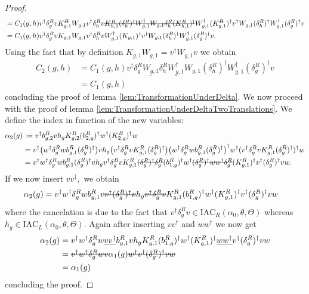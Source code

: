 \documentclass[11pt,a4paper,twoside]{article}
\numberwithin{equation}{section}
\begin{document}
\begin{proof}
\begin{align}
			&=C_1(g,h)v^\dagger \delta_g^R v K_{g,1}^\stkout{R} W_{g,1}v^\dagger \delta_h^R v \stkout{K_{h,1}^R (\delta_h^R)^\dagger W_{g,1}^\dagger W_{g,1}\delta_h^R (K_{h,1}^R)^\dagger} W_{g,1}^\dagger (K_{g,1}^\stkout{R})^\dagger v^\dagger W_{g,1}(\delta^R_h)^\dagger W_{g,1}^\dagger(\delta_g^R)^\dagger v\\
			&=C_1(g,h)v^\dagger \delta_g^R v K_{g,1} W_{g,1}v^\dagger \delta_h^R v W_{g,1}^\dagger (K_{g,1})^\dagger v^\dagger W_{g,1}(\delta^R_h)^\dagger W_{g,1}^\dagger(\delta_g^R)^\dagger v.
		\end{align}
		Using the fact that by definition $K_{g,1}W_{g,1}=v^\dagger W_{g,1}v$ we obtain
		\begin{align}
			C_2(g,h)&=C_1(g,h)v^\dagger \delta_g^R \underline{W_{g,1}} \delta_h^R \underline{W_{g,1}^\dagger} W_{g,1}(\delta^R_h)^\dagger W_{g,1}^\dagger(\delta_g^R)^\dagger v\\
			&=C_1(g,h)
		\end{align}
		concluding the proof of lemma \ref{lem:TransformationUnderDelta}. We now proceed with the proof of lemma \ref{lem:TransformationUnderDeltaTwoTranslations}. We define the index in function of the new variables:
		\begin{align}
			\alpha_2(g)&\defeq v^\dagger b^R_{g,2}v h_g K^R_{g,2}(b^R_{2,g})^\dagger w^\dagger (K^R_{2,g})^\dagger w\\
			&=v^\dagger \left(w^\dagger\delta^R_g w b_{g,1}^R (\delta^R_g)^\dagger\right) v h_g \left(v^\dagger \delta_g^R v K_{g,1}^R (\delta_g^R)^\dagger\right) \left(w^\dagger\delta^R_g w b_{g,1}^R (\delta^R_g)^\dagger\right)^\dagger w^\dagger (v^\dagger \delta_g^R v K_{g,1}^R (\delta_g^R)^\dagger)^\dagger w\\
			&=v^\dagger w^\dagger\delta^R_g w b_{g,1}^R (\delta^R_g)^\dagger v h_g v^\dagger \delta_g^R v K_{g,1}^R \stkout{(\delta_g^R)^\dagger \delta_g^R} (b_{1,g}^R)^\dagger w^\dagger \stkout{(\delta_g^R)^\dagger w w^\dagger \delta_g^R} (K_{g,1}^R)^\dagger v^\dagger (\delta_g^R)^\dagger v  w.
		\end{align}
		If we now insert $vv^\dagger,$ we obtain
		\begin{align}
			\alpha_2(g)&=v^\dagger w^\dagger\delta^R_g w b_{g,1}^R v\stkout{v^\dagger (\delta^R_g)^\dagger v} h_g \stkout{v^\dagger \delta_g^R v} K_{g,1}^R (b_{1,g}^R)^\dagger w^\dagger (K_{g,1}^R)^\dagger v^\dagger (\delta_g^R)^\dagger v  w
		\end{align}
		where the cancelation is due to the fact that $v^\dagger \delta^R_g v\in\textrm{IAC}_{R}(\alpha_0,\theta,\Theta)$ whereas $h_g\in \textrm{IAC}_{L}(\alpha_0,\theta,\Theta)$. Again after inserting $vv^\dagger$ and $ww^\dagger$ we now get
		\begin{align}
			\alpha_2(g)&=v^\dagger w^\dagger\delta^R_g w \underline{v v^\dagger} b_{g,1}^R v h_g K_{g,1}^R (b_{1,g}^R)^\dagger w^\dagger (K_{g,1}^R)^\dagger \underline{ww^\dagger} v^\dagger (\delta_g^R)^\dagger v  w\\
			&=\stkout{v^\dagger w^\dagger\delta^R_g w v} \alpha_1(g) \stkout{w^\dagger v^\dagger (\delta_g^R)^\dagger v  w}\\
			&=\alpha_1(g)
		\end{align}
		concluding the proof.
	\end{proof}
\end{document}
